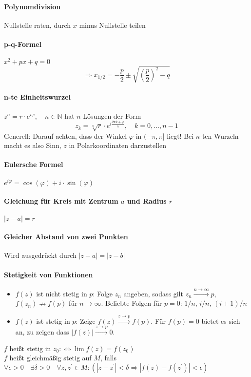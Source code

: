 \documentclass[a4paper, 10pt, DIV20, headings=small]{scrartcl}
\theoremstyle{definition}
\theoremstyle{plain}
\begin{document}
\paragraph{Polynomdivision}
Nullstelle raten, durch $x$ minus Nullstelle teilen

\paragraph{p-q-Formel}
$x^2 + px +q = 0$
$$\Rightarrow x_{1/2} = - \frac{p}{2} \pm \sqrt{\left(\frac{p}{2}\right)^2 - q}$$

\paragraph{n-te Einheitswurzel}
$z^n = r \cdot e^{i \varphi}, \quad n \in \mathbb{N}$
hat $n$ Lösungen der Form
$$z_k = \sqrt[n]{r} \cdot e^{i \frac{2\pi k + \varphi}{n}}, \quad k = 0, \ldots, n-1$$
Generell: Darauf achten, dass der Winkel $\varphi$ in $(-\pi,\pi]$ liegt!
Bei $n$-ten Wurzeln macht es also Sinn, $z$ in Polarkoordinaten darzustellen

\paragraph{Eulersche Formel}
$e^{i \varphi} = \cos(\varphi) + i \cdot \sin(\varphi)$

\paragraph{Gleichung für Kreis mit Zentrum $a$ und Radius $r$}
$|z-a| = r$

\paragraph{Gleicher Abstand von zwei Punkten}
Wird ausgedrückt durch $|z-a| = |z-b|$

\paragraph{Stetigkeit von Funktionen}
\begin{itemize}
\item $f(z)$ ist nicht stetig in $p$: Folge $z_n$ angeben, sodass gilt $z_n \overset{n \rightarrow \infty}{\longrightarrow} p$, $f(z_n) \nrightarrow f(p)$ für $n \rightarrow \infty$. Beliebte Folgen für $p=0$: $1/n$, $i/n$, $(i+1)/n$
\item $f(z)$ ist stetig in $p$: Zeige $f(z) \overset{z \rightarrow p}{\longrightarrow} f(p)$. Für $f(p)=0$ bietet es sich an, zu zeigen dass $|f(z)| \overset{z \rightarrow p}{\longrightarrow} 0$.
\end{itemize}
$f$ heißt stetig in $z_0 :\Leftrightarrow \lim f(z) = f(z_0)$ \\ $f$ heißt gleichmäßig stetig auf $M$, falls $\forall \epsilon > 0 \quad \exists \delta > 0 \quad \forall z,z^\prime \in M \colon (|z-z^\prime| < \delta \Rightarrow |f(z)-f(z^\prime)| < \epsilon)$
\end{document}
